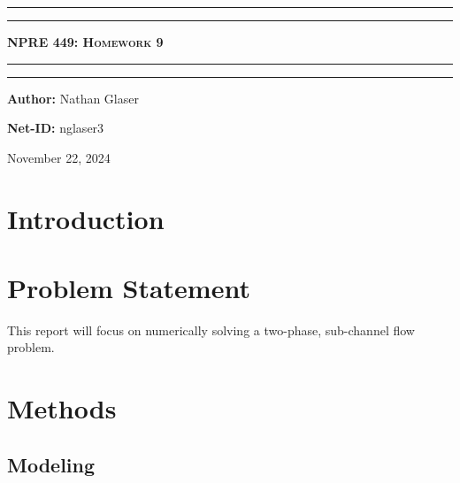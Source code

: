 \documentclass{article}
\begin{document}
\newcommand{\circled}[1]{\tikz[baseline=(char.base)]{
            \node[shape=circle,draw,inner sep=2pt] (char) {#1};}}

\newcommand{\pd}[3]{\frac{\partial^{#3}#1}{\partial {#2}^{#3}}}
\begin{titlepage}

\centering
\scshape
\vspace{\baselineskip}

%
\rule{\textwidth}{1.6pt}\vspace*{-\baselineskip}\vspace*{2pt}
\rule{\textwidth}{0.4pt}

{\Huge \textbf{\textsc{NPRE 449: Homework 9 \\
\vspace{15pt}}}}

\rule{\textwidth}{0.4pt}\vspace*{-\baselineskip}\vspace{3.2pt}
\rule{\textwidth}{1.6pt}\vspace{6pt}
\vspace{1.5\baselineskip}


\large \centerline{\textbf{Author:} Nathan Glaser}
\large \centerline{\textbf{Net-ID:} nglaser3}
\quad

\vfill
\large \centerline{November 22, 2024}
%
\end{titlepage}

\tableofcontents
\clearpage
\listoffigures
\clearpage
\listoftables
\clearpage
{}

\section{Introduction}

\section{Problem Statement}

This report will focus on numerically solving a two-phase, sub-channel flow problem. 

\section{Methods}

\subsection{Modeling}
\end{document}
